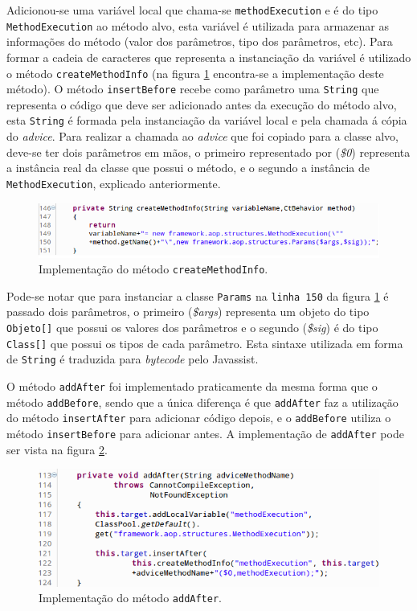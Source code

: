 \documentclass[tc,oneside]{iiufrgs}
\begin{document}
Adicionou-se uma variável local que chama-se \texttt{methodExecution} e é do tipo \texttt{MethodExecution} ao método alvo, esta variável é utilizada para armazenar as informações do método (valor dos parâmetros, tipo dos parâmetros, etc). Para formar a cadeia de caracteres que representa a instanciação da variável é utilizado o método \texttt{createMethodInfo} (na figura \ref{fig:createmethodinfo} encontra-se a implementação deste método). O método \texttt{insertBefore} recebe como parâmetro uma \texttt{String} que representa o código que deve ser adicionado antes da execução do método alvo, esta \texttt{String} é formada pela instanciação da variável local e pela chamada á cópia do \textit{advice}.  Para realizar a chamada ao \textit{advice} que foi copiado para a classe alvo, deve-se ter dois parâmetros em mãos, o primeiro representado por (\textit{\$0}) representa a instância real da classe que possui o método, e o segundo a instância de \texttt{MethodExecution}, explicado anteriormente.


\begin{figure}[ht]
	\centering
	\includegraphics[scale=0.5]{figuras/implementacao/createmethodinfo.png}
	\caption{Implementação do método \texttt{createMethodInfo}.}
	\label{fig:createmethodinfo}
\end{figure}

Pode-se notar que para instanciar a classe \texttt{Params} na \texttt{linha 150} da figura \ref{fig:createmethodinfo} é passado dois parâmetros, o primeiro (\textit{\$args}) representa um objeto do tipo \texttt{Objeto[]} que possui os valores dos parâmetros e o segundo (\textit{\$sig}) é do tipo \texttt{Class[]} que possui os tipos de cada parâmetro. Esta sintaxe utilizada em forma de \texttt{String} é traduzida para \textit{bytecode} pelo Javassist.
 
O método \texttt{addAfter} foi implementado praticamente da mesma forma que o método \texttt{addBefore}, sendo que a única diferença é que \texttt{addAfter} faz a utilização do método \texttt{insertAfter} para adicionar código depois, e o \texttt{addBefore} utiliza o método \texttt{insertBefore} para adicionar antes. A implementação de \texttt{addAfter} pode ser vista na figura \ref{fig:addafter}.
 
 
\begin{figure}[ht]
	\centering
	\includegraphics[scale=0.6]{figuras/implementacao/addafter.png}
	\caption{Implementação do método \texttt{addAfter}.}
	\label{fig:addafter}
\end{figure}
\end{document}
